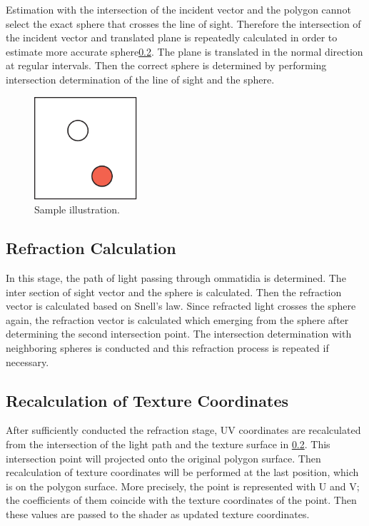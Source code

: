 Estimation with the intersection of the incident vector and the polygon cannot select the exact sphere that crosses the line of sight.
Therefore the intersection of the incident vector and translated plane is repeatedly calculated in order to estimate more accurate sphere\ref{}.
The plane is translated in the normal direction at regular intervals. Then the correct sphere is determined by performing intersection determination of the line of sight and the sphere.
\begin{figure}[ht]
  \centering
  \includegraphics[width=1.5in]{images/samplefigure}
  \caption{Sample illustration.}
\end{figure}

\subsection{Refraction Calculation}
In this stage, the path of light passing through ommatidia is determined.
The inter section of sight vector and the sphere is calculated.
Then the refraction vector is calculated based on Snell’s law.
Since refracted light crosses the sphere again, the refraction vector is calculated which emerging from the sphere after determining the second intersection point.
The intersection determination with neighboring spheres is conducted and this refraction process is repeated if necessary.

\subsection{Recalculation of Texture Coordinates}
After sufficiently conducted the refraction stage, UV coordinates are recalculated from the intersection of the light path and the texture surface in \ref{}.
This intersection point will projected onto the original polygon surface.
Then recalculation of texture coordinates will be performed at the last position, which is on the polygon surface.
More precisely, the point is represented with U and V; the coefficients of them coincide with the texture coordinates of the point.
Then these values are passed to the shader as updated texture coordinates.

